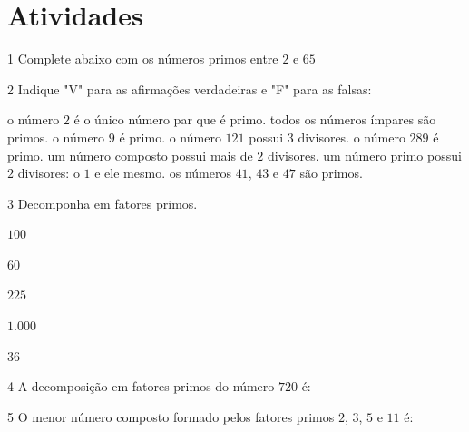 \section{Atividades}

\num{1}  Complete abaixo com os números primos entre $2$ e $65$



\num{2}  Indique "V" para as afirmações verdadeiras e "F" para as falsas:

\begin{boxlist}
 o número $2$ é o único número par que é primo.
 todos os números ímpares são primos.
 o número $9$ é primo.
 o número $121$ possui $3$ divisores.
 o número $289$ é primo.
 um número composto possui mais de $2$ divisores.
 um número primo possui $2$ divisores: o $1$ e ele mesmo.
 os números $41$, $43$ e $47$ são primos.
\end{boxlist}

\num{3} Decomponha em fatores primos.

\begin{escolha}
\item  $100$    
\item  $60$     
\item  $225$    
\item  $1.000$  
\item  $36$     
\end{escolha}

\num{4} A decomposição em fatores primos do número $720$ é:


\num{5}  O menor número composto formado pelos fatores primos $2$, $3$, $5$ e $11$ é:


